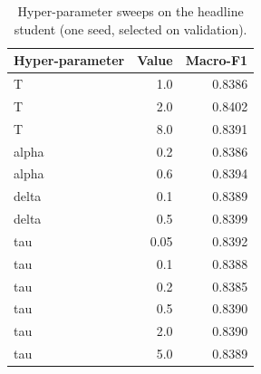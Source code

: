 \begin{table}[t]
\centering
\caption{Hyper-parameter sweeps on the headline student (one seed, selected on validation).}
\label{tab:sweeps}
\begin{tabular}{lrr}
\toprule
Hyper-parameter & Value & Macro-F1 \\
\midrule
T & 1.0 & 0.8386 \\
T & 2.0 & 0.8402 \\
T & 8.0 & 0.8391 \\
alpha & 0.2 & 0.8386 \\
alpha & 0.6 & 0.8394 \\
delta & 0.1 & 0.8389 \\
delta & 0.5 & 0.8399 \\
tau & 0.05 & 0.8392 \\
tau & 0.1 & 0.8388 \\
tau & 0.2 & 0.8385 \\
tau & 0.5 & 0.8390 \\
tau & 2.0 & 0.8390 \\
tau & 5.0 & 0.8389 \\
\bottomrule
\end{tabular}
\end{table}